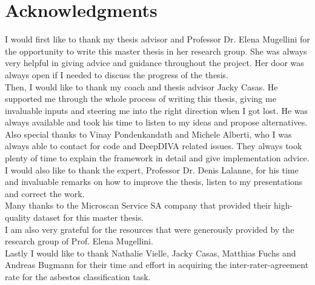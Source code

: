 \documentclass[11pt,a4paper,twoside,hidelinks,openright]{rvsmaster}
\makeatletter
\def\cleardoublepage{\clearpage\if@twoside \ifodd\c@page\else
	\hbox{}
	\thispagestyle{empty}
	\newpage
\fi\fi}
\makeatother
\begin{document}
\tableofcontents{}
\listoffigures{}
\listoftables{}



\chapter*{Acknowledgments}

I would first like to thank my thesis advisor and Professor Dr. Elena Mugellini for the opportunity to write this master thesis in her research group. She was always very helpful in giving advice and guidance throughout the project. Her door was always open if I needed to discuss the progress of the thesis.\\


Then, I would like to thank my coach and thesis advisor Jacky Casas. He supported me through the whole process of writing this thesis, giving me invaluable inputs and steering me into the right direction when I got lost. He was always available and took his time to listen to my ideas and propose alternatives.\\


Also special thanks to Vinay Pondenkandath and Michele Alberti, who I was always able to contact for code and DeepDIVA related issues. They always took plenty of time to explain the framework in detail and give implementation advice.\\


I would also like to thank the expert, Professor Dr. Denis Lalanne, for his time and invaluable remarks on how to improve the thesis, listen to my presentations and correct the work. \\


Many thanks to the Microscan Service SA company that provided their high-quality dataset for this master thesis.\\


I am also very grateful for the resources that were generously provided by the research group of Prof. Elena Mugellini.  \\

Lastly I would like to thank Nathalie Vielle, Jacky Casas, Matthias Fuchs and Andreas Bugmann for their time and effort in acquiring the inter-rater-agreement rate for the asbestos classification task.

\cleardoublepage
\setcounter{page}{1}	%













\end{document}
